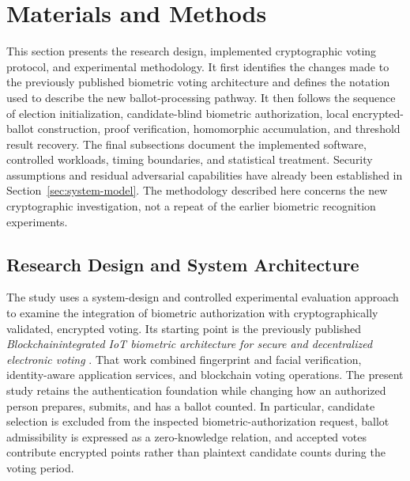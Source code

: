 
\section{Materials and Methods}
\label{sec:04}
\label{sec:architecture}

This section presents the research design, implemented cryptographic voting
protocol, and experimental methodology. It first identifies the changes made
to the previously published biometric voting architecture and defines the
notation used to describe the new ballot-processing pathway. It then follows
the sequence of election initialization, candidate-blind biometric
authorization, local encrypted-ballot construction, proof verification,
homomorphic accumulation, and threshold result recovery. The final
subsections document the implemented software, controlled workloads, timing
boundaries, and statistical treatment. Security assumptions and residual
adversarial capabilities have already been established in
Section~\ref{sec:system-model}. The methodology described here concerns the
new cryptographic investigation, not a repeat of the earlier biometric
recognition experiments.

\subsection{Research Design and System Architecture}
\label{subsec:architecture-overview}

The study uses a system-design and controlled experimental evaluation
approach to examine the integration of biometric authorization with
cryptographically validated, encrypted voting. Its starting point is the
previously published \emph{Blockchain\textendash{}integrated IoT biometric
architecture for secure and decentralized electronic voting}
\citep{rifat2026biometric}. That work combined fingerprint and facial
verification, identity-aware application services, and blockchain voting
operations. The present study retains the authentication foundation while
changing how an authorized person prepares, submits, and has a ballot counted.
In particular, candidate selection is excluded from the inspected
biometric-authorization request, ballot admissibility is expressed as a
zero-knowledge relation, and accepted votes contribute encrypted points
rather than plaintext candidate counts during the voting period.

